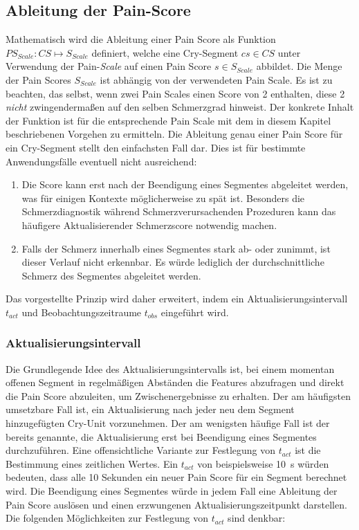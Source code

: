 \subsection{Ableitung der Pain-Score}
\label{sec:regressionPainScore}

Mathematisch wird die Ableitung einer Pain Score als Funktion $PS_{Scale}: CS \mapsto S_{Scale}$ definiert, welche eine Cry-Segment $cs \in CS$ unter Verwendung der Pain-\emph{Scale} auf einen Pain Score $s \in S_{Scale}$ abbildet. Die Menge der Pain Scores $S_{Scale}$ ist abhängig von der verwendeten Pain Scale. Es ist zu beachten, das selbst, wenn zwei Pain Scales einen Score von 2 enthalten, diese 2 \emph{nicht} zwingendermaßen auf den selben Schmerzgrad hinweist. Der konkrete Inhalt der Funktion ist für die entsprechende Pain Scale mit dem in diesem Kapitel beschriebenen Vorgehen zu ermitteln. Die Ableitung genau einer Pain Score für ein Cry-Segment stellt den einfachsten Fall dar. Dies ist für bestimmte Anwendungsfälle eventuell nicht ausreichend: 
\begin{enumerate}
\item Die Score kann erst nach der Beendigung eines Segmentes abgeleitet werden, was für einigen Kontexte möglicherweise zu spät ist. Besonders die Schmerzdiagnostik während Schmerzverursachenden Prozeduren kann das häufigere \glqq Aktualisieren\grqq der Schmerzscore notwendig machen.
\item Falls der Schmerz innerhalb eines Segmentes stark ab- oder zunimmt, ist dieser Verlauf nicht erkennbar. Es würde lediglich der \glqq durchschnittliche Schmerz\grqq{} des Segmentes abgeleitet werden.
\end{enumerate}

Das vorgestellte Prinzip wird daher erweitert, indem ein Aktualisierungsintervall $t_{act}$ und Beobachtungszeitraume $t_{obs}$ eingeführt wird.

\subsubsection{Aktualisierungsintervall}

 Die Grundlegende Idee des Aktualisierungsintervalls ist, bei einem momentan offenen Segment in regelmäßigen Abständen die Features abzufragen und direkt die Pain Score abzuleiten, um Zwischenergebnisse zu erhalten. Der am häufigsten umsetzbare Fall ist, ein Aktualisierung nach jeder neu dem Segment hinzugefügten Cry-Unit vorzunehmen. Der am wenigsten häufige Fall ist der bereits genannte, die Aktualisierung erst bei Beendigung eines Segmentes durchzuführen. Eine offensichtliche Variante zur Festlegung von $t_{act}$ ist die Bestimmung eines zeitlichen Wertes. Ein $t_{act}$ von beispielsweise \SI{10}{\second} würden bedeuten, dass alle 10 Sekunden ein neuer Pain Score für ein Segment berechnet wird. Die Beendigung eines Segmentes würde in jedem Fall eine Ableitung der Pain Score auslösen und einen \glqq erzwungenen Aktualisierungszeitpunkt\grqq{} darstellen. Die folgenden Möglichkeiten zur Festlegung von $t_{act}$ sind denkbar:
 
